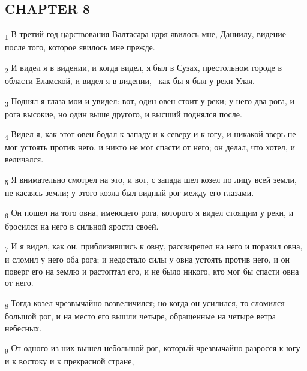 \subsection{CHAPTER 8}
\begin{tcolorbox}
\textsubscript{1} В третий год царствования Валтасара царя явилось мне, Даниилу, видение после того, которое явилось мне прежде.
\end{tcolorbox}
\begin{tcolorbox}
\textsubscript{2} И видел я в видении, и когда видел, я был в Сузах, престольном городе в области Еламской, и видел я в видении, --как бы я был у реки Улая.
\end{tcolorbox}
\begin{tcolorbox}
\textsubscript{3} Поднял я глаза мои и увидел: вот, один овен стоит у реки; у него два рога, и рога высокие, но один выше другого, и высший поднялся после.
\end{tcolorbox}
\begin{tcolorbox}
\textsubscript{4} Видел я, как этот овен бодал к западу и к северу и к югу, и никакой зверь не мог устоять против него, и никто не мог спасти от него; он делал, что хотел, и величался.
\end{tcolorbox}
\begin{tcolorbox}
\textsubscript{5} Я внимательно смотрел на это, и вот, с запада шел козел по лицу всей земли, не касаясь земли; у этого козла был видный рог между его глазами.
\end{tcolorbox}
\begin{tcolorbox}
\textsubscript{6} Он пошел на того овна, имеющего рога, которого я видел стоящим у реки, и бросился на него в сильной ярости своей.
\end{tcolorbox}
\begin{tcolorbox}
\textsubscript{7} И я видел, как он, приблизившись к овну, рассвирепел на него и поразил овна, и сломил у него оба рога; и недостало силы у овна устоять против него, и он поверг его на землю и растоптал его, и не было никого, кто мог бы спасти овна от него.
\end{tcolorbox}
\begin{tcolorbox}
\textsubscript{8} Тогда козел чрезвычайно возвеличился; но когда он усилился, то сломился большой рог, и на место его вышли четыре, обращенные на четыре ветра небесных.
\end{tcolorbox}
\begin{tcolorbox}
\textsubscript{9} От одного из них вышел небольшой рог, который чрезвычайно разросся к югу и к востоку и к прекрасной стране,
\end{tcolorbox}
